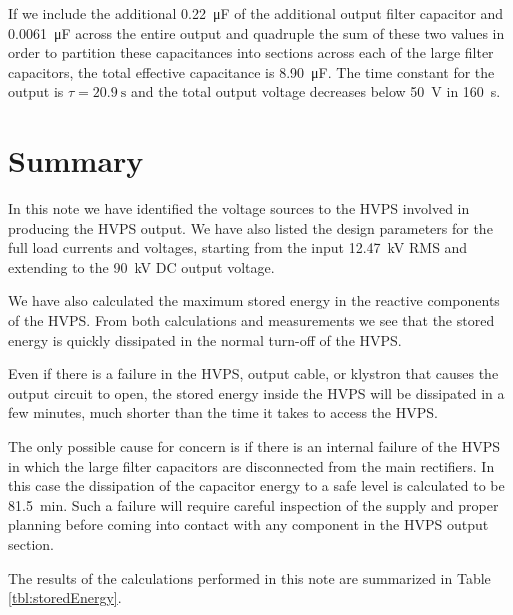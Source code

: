 \documentclass[letterpaper,11pt]{article}
\begin{document}
If we include the additional \SI{0.22}{\micro\farad} of the additional output filter capacitor and \SI{0.0061}{\micro\farad} across the entire output and quadruple the sum of these two values in order to partition these capacitances into sections across each of the large filter capacitors, the total effective capacitance is \SI{8.90}{\micro\farad}.  The time constant for the output is $\tau = \SI{20.9}{\second}$ and the total output voltage decreases below \SI{50}{\volt} in \SI{160}{\second}.

\section{Summary}
In this note we have identified the voltage sources to the HVPS involved in producing the HVPS output.  We have also listed the design parameters for the full load currents and voltages, starting from the input \SI{12.47}{\kV} RMS and extending to the \SI{90}{\kV} DC output voltage.

We have also calculated the maximum stored energy in the reactive components of the HVPS.  From both calculations and measurements we see that the stored energy is quickly dissipated in the normal turn-off of the HVPS.

Even if there is a failure in the HVPS, output cable, or klystron that causes the output circuit to open, the stored energy inside the HVPS will be dissipated in a few minutes, much shorter than the time it takes to access the HVPS.

The only possible cause for concern is if there is an internal failure of the HVPS in which the large filter capacitors are disconnected from the main rectifiers.  In this case the dissipation of the capacitor energy to a safe level is calculated to be \SI{81.5}{\minute}.  Such a failure will require careful inspection of the supply and proper planning before coming into contact with any component in the HVPS output section.

The results of the calculations performed in this note are summarized in Table \ref{tbl:storedEnergy}.
\end{document}
